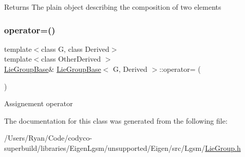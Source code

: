 \begin{DoxyReturn}{Returns}
The plain object describing the composition of two elements 
\end{DoxyReturn}
\hypertarget{class_lie_group_base_a04e47ec54e5898190682b03794a6b9af}{}\label{class_lie_group_base_a04e47ec54e5898190682b03794a6b9af} 
\subsubsection{\texorpdfstring{operator=()}{operator=()}}
{\footnotesize\ttfamily template$<$class G, class Derived$>$ \\
template$<$class Other\+Derived $>$ \\
\hyperlink{class_lie_group_base}{Lie\+Group\+Base}\& \hyperlink{class_lie_group_base}{Lie\+Group\+Base}$<$ G, Derived $>$\+::operator= (\begin{DoxyParamCaption}\item[{const \hyperlink{class_lie_group_base}{Lie\+Group\+Base}$<$ G, Other\+Derived $>$ \&}]{ }\end{DoxyParamCaption})}

Assignement operator 

The documentation for this class was generated from the following file\+:\begin{DoxyCompactItemize}
\item 
/\+Users/\+Ryan/\+Code/codyco-\/superbuild/libraries/\+Eigen\+Lgsm/unsupported/\+Eigen/src/\+Lgsm/\hyperlink{_lie_group_8h}{Lie\+Group.\+h}\end{DoxyCompactItemize}
